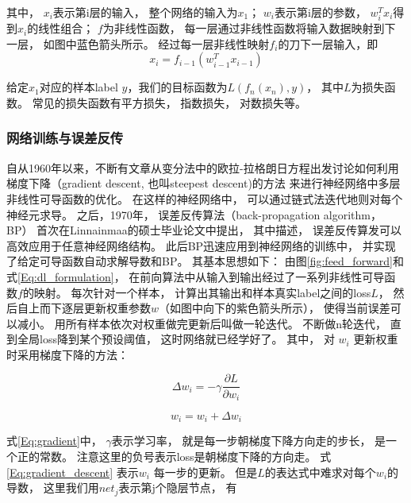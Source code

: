 其中， $x_i$表示第i层的输入， 整个网络的输入为$x_1$； $w_i$表示第i层的参数， $w_i^Tx_i$得到$x_i$的线性组合； $f$为非线性函数， 每一层通过非线性函数将输入数据映射到下一层， 如图中蓝色箭头所示。 经过每一层非线性映射$f_i$的刀下一层输入，即
\begin{equation}
 x_i = f_{i-1}(w_{i-1}^Tx_{i-1})
\end{equation}

给定$x_1$对应的样本label $y$，我们的目标函数为$L(f_n(x_n),y)$， 其中$L$为损失函数。 常见的损失函数有平方损失， 指数损失， 对数损失等。 



\subsubsection{网络训练与误差反传}\label{sec:train_net}

自从1960年以来，不断有文章\cite{griewank2012documenta,director1969generalized,gray1965effect,bellman1962applied,
kelley1960cutting,bryson1961diffraction}从变分法中的欧拉-拉格朗日方程出发讨论如何利用梯度下降（gradient descent, 也叫steepest descent)的方法\cite{hadamard1908memoire} 来进行神经网络中多层非线性可导函数的优化。
在这样的神经网络中， 可以通过链式法迭代地则对每个神经元求导\cite{bellman1962applied}。 之后，1970年， 误差反传算法（back-propagation algorithm， BP）\cite{hecht1989theory,goh1995back} 首次在Linnainmaa的硕士毕业论文\cite{linnainmaa1970representation}中提出， 其中描述， 误差反传算发可以高效应用于任意神经网络结构。 此后BP迅速应用到神经网络的训练中， 并实现了给定可导函数自动求解导数和BP\cite{speelpenning1980compiling}。 其基本思想如下： 由图\ref{fig:feed_forward}和式\ref{Eq:dl_formulation}， 在前向算法中从输入到输出经过了一系列非线性可导函数$f$的映射。  每次针对一个样本， 计算出其输出和样本真实label之间的loss$L$， 然后自上而下逐层更新权重参数$w$（如图中向下的紫色箭头所示）， 使得当前误差可以减小。 用所有样本依次对权重做完更新后叫做一轮迭代。 不断做n轮迭代， 直到全局loss降到某个预设阈值， 这时网络就已经学好了。 其中， 对 $w_i$ 更新权重时采用梯度下降的方法：

\begin{equation}
\label{Eq:gradient}
	\Delta w_i = -\gamma \frac{\partial L}{\partial w_i}
\end{equation}

\begin{equation}
\label{Eq:gradient_descent}
	w_i = w_i + \Delta w_i
\end{equation}

式\ref{Eq:gradient}中， $\gamma$表示学习率， 就是每一步朝梯度下降方向走的步长， 是一个正的常数。 注意这里的负号表示loss是朝梯度下降的方向走。 式\ref{Eq:gradient_descent} 表示$w_i$ 每一步的更新。 但是$L$的表达式中难求对每个$w_i$的导数， 这里我们用$net_{j}$表示第j个隐层节点， 有

